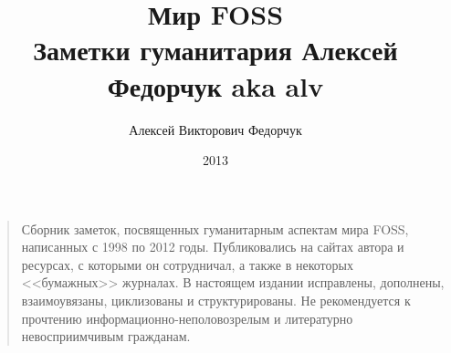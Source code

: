 \documentclass[12pt,a4paper,twoside,openany,svgnames]{memoir}
\author{Алексей Викторович Федорчук} %
\title{Мир FOSS\\Заметки гуманитария Алексей Федорчук aka alv}
\date{2013}
\begin{document}
\maketitle

\begin{quotation}
\noindent
Сборник заметок, посвященных гуманитарным аспектам мира FOSS, написанных с 1998 по 2012 годы. Публиковались на сайтах автора и ресурсах, с которыми он сотрудничал, а также в некоторых <<бумажных>> журналах. В настоящем издании исправлены, дополнены, взаимоувязаны, циклизованы и структурированы. Не рекомендуется к прочтению информационно-неполовозрелым и литературно невосприимчивым гражданам.
\end{quotation}
\clearpage
\tableofcontents
\clearpage









\end{document}
